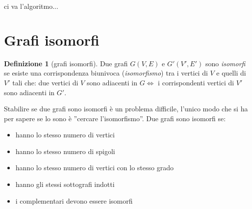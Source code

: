 \documentclass[a4paper, openany]{book}
\theoremstyle{plain}
\theoremstyle{definition}
\newtheorem{defn}{Definizione}[chapter]
\begin{document}
ci va l'algoritmo...

\section{Grafi isomorfi}
\begin{defn}[grafi isomorfi]
Due grafi $G(V,E)$ e $G'(V',E')$ sono \emph{isomorfi} se esiste una corrispondenza biunivoca
(\emph{isomorfismo}) tra i vertici di $V$ e quelli di $V'$ tali che: due vertici di $V$ sono
adiacenti in $G \iff $ i corrispondenti vertici di $V'$ sono adiacenti in $G'$. 
\end{defn}
Stabilire se due grafi sono isomorfi è un problema difficile, l'unico modo che si ha per 
sapere se lo sono è ''cercare l'isomorfismo''.
Due grafi sono isomorfi se:
\begin{itemize}
    \item hanno lo stesso numero di vertici
    \item hanno lo stesso numero di spigoli
    \item hanno lo stesso numero di vertici con lo stesso grado
    \item hanno gli stessi sottografi indotti
    \item i complementari devono essere isomorfi
\end{itemize}
\end{document}
